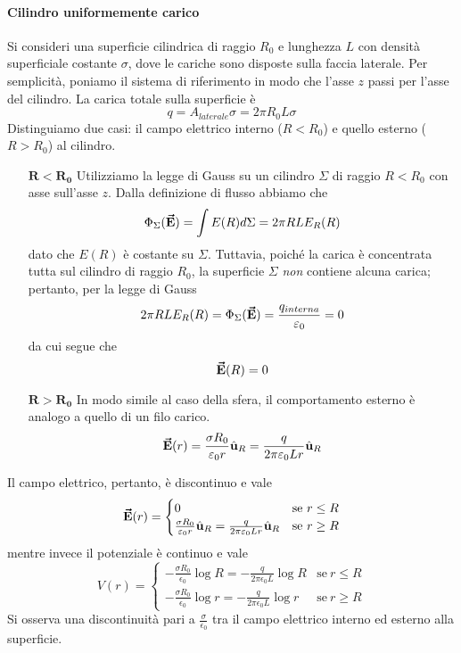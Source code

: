 \paragraph{Cilindro uniformemente carico}
Si consideri una superficie cilindrica di raggio $R_0$ e lunghezza $L$ con densità superficiale costante $\sigma$, dove le cariche sono disposte sulla faccia laterale. Per semplicità, poniamo il sistema di riferimento in modo che l'asse $z$ passi per l'asse del cilindro.
La carica totale sulla superficie è
\begin{equation}
	q=A_{laterale} \sigma=2\pi R_0 L \sigma
\end{equation}
Distinguiamo due casi: il campo elettrico interno ($R<R_0$) e quello esterno ($R>R_0$) al cilindro.
\begin{itemize}
	\item[$\mathbf{R<R_0}$] Utilizziamo la legge di Gauss su un cilindro $\Sigma$ di raggio $R<R_0$ con asse sull'asse $z$. Dalla definizione di flusso abbiamo che
	\begin{equation*}
		\Phi_{\Sigma}(\vb*{\va{E}})=\int E(R)d\Sigma=2\pi R L E_R(R)
	\end{equation*}
	dato che $E(R)$ è costante su $\Sigma$.
	Tuttavia, poiché la carica è concentrata tutta sul cilindro di raggio $R_0$, la superficie $\Sigma$ \textit{non} contiene alcuna carica; pertanto, per la legge di Gauss
	\begin{equation*}
		2\pi R L E_R(R)=\Phi_{\Sigma}(\vb*{\va{E}})=\frac{q_{interna}}{\varepsilon_0}=0
	\end{equation*}
	da cui segue che
	\begin{equation}
		\vb*{\va{E}}(R)=0
	\end{equation}
	\item[$\mathbf{R>R_0}$] In modo simile al caso della sfera, il comportamento esterno è analogo a quello di un filo carico. %
	\begin{equation}
		\vb*{\va{E}}(r)=\frac{\sigma R_0}{\varepsilon_0r}\hat{\mathbf{u}}_R=\frac{q}{2\pi\varepsilon_0Lr}\hat{\mathbf{u}}_R
	\end{equation}
\end{itemize}
Il campo elettrico, pertanto, è discontinuo e vale
\begin{equation}
	\vb*{\va{E}}(r)=\begin{cases}
		0&\text{se}\ r\leq R\\
		\frac{\sigma R_0}{\varepsilon_0r}\hat{\mathbf{u}}_R=\frac{q}{2\pi\varepsilon_0Lr}\hat{\mathbf{u}}_R &\text{se}\ r\geq R
	\end{cases}
\end{equation}
mentre invece il potenziale è continuo e vale
\begin{equation}
	V(r)=
	\begin{cases}
		-\frac{\sigma R_0}{\epsilon_0}\log R=-\frac{q}{2\pi\epsilon_0L}\log R&\text{se}\ r\leq R\\
		-\frac{\sigma R_0}{\epsilon_0}\log r=-\frac{q}{2\pi\epsilon_0L}\log r&\text{se}\ r\geq R
	\end{cases}
\end{equation}
Si osserva una discontinuità pari a $\frac{\sigma}{\epsilon_0}$ tra il campo elettrico interno ed esterno alla superficie.
